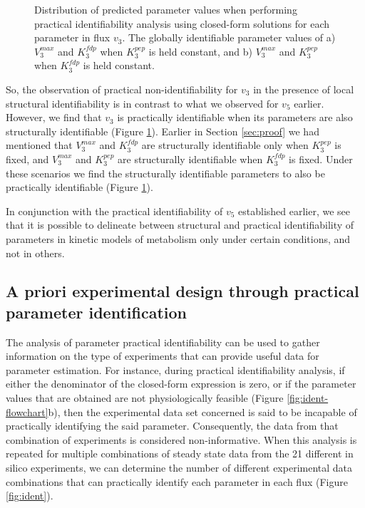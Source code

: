 \documentclass[10pt]{article}
\begin{document}
	\begin{figure}[!tbhp]
		\caption{Distribution of predicted parameter values when performing practical identifiability analysis using closed-form solutions for each parameter in flux $v_3$. The globally identifiable parameter values of a)  $V_3^{max}$ and $K_3^{fdp}$ when $K_3^{pep}$ is held constant, and b) $V_3^{max}$ and $K_3^{pep}$ when $K_3^{fdp}$ is held constant.}\label{fig:v3_var_ck_values}
	\end{figure}	

	So, the observation of practical non-identifiability for $v_3$ in the presence of local structural identifiability is in contrast to what we observed for $v_5$ earlier. However, we find that $v_3$ is practically identifiable when its parameters are also structurally identifiable (Figure \ref{fig:v3_var_ck_values}). Earlier in Section \ref{sec:proof} we had mentioned that $V_3^{max}$ and $K_3^{fdp}$ are structurally identifiable only when $K_3^{pep}$ is fixed, and $V_3^{max}$ and $K_3^{pep}$ are structurally identifiable when $K_3^{fdp}$ is fixed. Under these scenarios we find the structurally identifiable parameters to also be practically identifiable (Figure \ref{fig:v3_var_ck_values}).	
	
	In conjunction with the practical identifiability of $v_5$ established earlier, we see that it is possible to delineate between structural and practical identifiability of parameters in kinetic models of metabolism only under certain conditions, and not in others.
	
	\subsection{A priori experimental design through practical parameter identification}\label{sec:design}	
	The analysis of parameter practical identifiability can be used to gather information on the type of experiments that can provide useful data for parameter estimation. For instance, during practical identifiability analysis, if either the denominator of the closed-form expression is zero, or if the parameter values that are obtained are not physiologically feasible (Figure \ref{fig:ident-flowchart}b), then the experimental data set concerned is said to be incapable of practically identifying the said parameter. Consequently, the data from that combination of experiments is considered non-informative. When this analysis is repeated for multiple combinations of steady state data from the 21 different in silico experiments, we can determine the number of different experimental data combinations that can practically identify each parameter in each flux (Figure \ref{fig:ident}).
	
\end{document}
